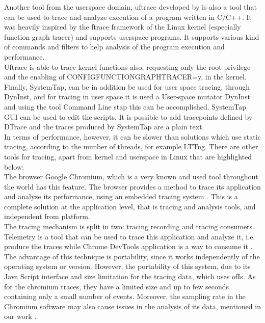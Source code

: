 Another tool from the userspace domain, uftrace developed by \cite{uftrace} is also a tool that can be used to trace and analyze execution of a program written in C/C++. It was heavily inspired by the ftrace framework of the Linux kernel (especially function graph tracer) and supports userspace programs. It supports various kind of commands and filters to help analysis of the program execution and performance.\\
Uftrace is able to trace kernel functions also, requesting only the root privilege and the enabling of CONFIGFUNCTION\textunderscore GRAPH\textunderscore TRACER=y, in the kernel.\\
Finally, SystemTap, can be in addition be used for user space tracing, through DynInst, and for tracing in user space it is used a User-space mutator DynInst \cite{dyninst} and using the tool Command Line stap this can be accomplished. SystemTap GUI can be used to edit the scripts. It is possible to add tracepoints defined by DTrace and the traces produced by SystemTap are a plain text.\\
In terms of performance, however, it can be slower than solutions which use static tracing, according to the number of threads, for example LTTng.
There are other tools for tracing, apart from kernel and userspace in Linux that are highlighted below:\\
The browser Google Chromium, which is a very known and used tool throughout the world has this feature. The browser provides a method to trace its application and analyze its performance, using an embedded tracing system \cite{chromium_project}. This is a complete solution at the application level, that is tracing and analysis tools, and independent from platform.\\
The tracing mechanism is split in two: tracing recording and tracing consumers. Telemetry is a tool that can be used to trace this application and analyze it, i.e. produce the traces while Chrome DevTools application is a way to consume it \cite{trace_chromium}.\\
The advantage of this technique is portability, since it works independently of the operating system or version. However, the portability of this system, due to its Java Script interface and size limitation for the tracing data, which uses ofIs. As for the chromium traces, they have a limited size and up to few seconds containing only a small number of events. Moreover, the sampling rate in the Chromium software may also cause issues in the analysis of its data, mentioned in our work \cite{google_releases}.\\

